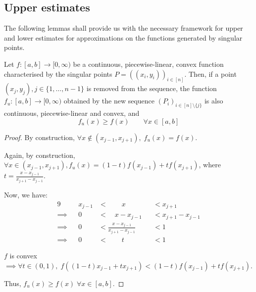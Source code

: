 \subsection{Upper estimates}
\label{subsec:asian-upper-estimates}

The following lemmas shall provide us with the necessary framework for upper and lower estimates for approximations on the functions generated by singular points.

\begin{lmm}
	\label{lmm:asian-upper-estimate}
	Let $ f:[a,b] \to [0, \infty) $ be a continuous, piecewise-linear, convex function characterised by the singular points $ P = ( (x_i, y_i) )_{i \in [n]} $. Then, if a point $ (x_j, y_j), j \in \{ 1, \dots, n-1\} $ is removed from the sequence, the function $ f_u: [a,b] \to [0, \infty) $ obtained by the new sequence $ (P_i)_{i \in [n] \setminus \{ j \}} $ is also continuous, piecewise-linear and convex, and
	\begin{equation}
		f_u(x) \ge f(x) \qquad \forall x \in [a,b]
	\end{equation}
\end{lmm}

\begin{proof}
	By construction, $ \forall x \notin ( x_{j-1} , x_{j+1} ), \; f_u(x) = f(x) $.
	
	Again, by construction, $ \forall x \in ( x_{j-1} , x_{j+1} ), f_u(x) = (1-t) f(x_{j-1}) + t f(x_{j+1}) $, where $ t = \frac{ x - x_{j-1} }{ x_{j+1} - x_{j-1} } $.
	
	Now, we have:
	\begin{alignat*}{9}
		          && x_{j-1}  & <  \qquad x          && <  x_{j+1} \\
		\implies  &&       0  & <  \quad x - x_{j-1} && <  x_{j+1} - x_{j-1} \\
		\implies  &&       0  & <  \frac{ x - x_{j-1} }{ x_{j+1} - x_{j-1} } && <  1 \\
		\implies  &&       0  & <  \qquad t          && <  1
	\end{alignat*}
	
	$f$ is convex $\implies \forall t \in (0,1), \; f( (1-t) x_{j-1} + t x_{j+1} ) < (1-t) f(x_{j-1}) + t f(x_{j+1}) $.
	
	Thus, $ f_u(x) \ge f(x) \; \forall x \in [a,b]$.
\end{proof}


